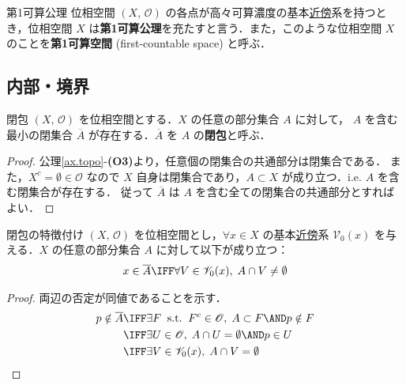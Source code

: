 \documentclass[geometry_main]{subfiles}
\begin{document}
\begin{mydef}{第1可算公理}
	位相空間 $(X,\, \mathscr{O})$ の各点が高々可算濃度の基本\hyperref[def:neighborhood]{近傍}系を持つとき，位相空間 $X$ は\textbf{第1可算公理}を充たすと言う．また，このような位相空間 $X$ のことを\textbf{第1可算空間} (first-countable space) と呼ぶ．
\end{mydef}

\subsection{内部・境界}

\begin{myprop}{閉包}
	$(X,\, \mathscr{O})$ を位相空間とする．$X$ の任意の部分集合 $A$ に対して， $A$ を含む最小の閉集合 $\overline{A}$ が存在する．$\overline{A}$ を $A$ の\textbf{閉包}と呼ぶ．
\end{myprop}
\begin{proof}
	公理\ref{ax.topo}-\textbf{(O3)}より，任意個の閉集合の共通部分は閉集合である．
	また，$X^c = \emptyset \in \mathscr{O}$ なので $X$ 自身は閉集合であり，$A \subset X$ が成り立つ．i.e. $A$ を含む閉集合が存在する．
	従って $\overline{A}$ は $A$ を含む全ての閉集合の共通部分とすればよい．
\end{proof}

\begin{mytheo}[label=thm:closure1]{閉包の特徴付け}
	$(X,\, \mathscr{O})$ を位相空間とし，$\forall x \in X$ の基本\hyperref[def:neighborhood]{近傍}系 $\mathscr{V}_0(x)$ を与える．$X$ の任意の部分集合 $A$ に対して以下が成り立つ：
	\begin{align}
		x \in \overline{A} \IFF \forall V \in \mathscr{V}_0(x),\; A \cap V \neq \emptyset
	\end{align}
\end{mytheo}

\begin{proof}
	両辺の否定が同値であることを示す．
	\begin{align}
		p \notin \overline{A} &\IFF \exists F\mathrel{}\mathrm{s.t.}\mathrel{} F^c \in \mathscr{O},\; A \subset F \AND p \notin F \\
		&\IFF \exists U \in \mathscr{O},\; A \cap U = \emptyset \AND p \in U \\
		&\IFF \exists V \in \mathscr{V}_0(x),\; A \cap V = \emptyset
	\end{align}
\end{proof}
\end{document}

